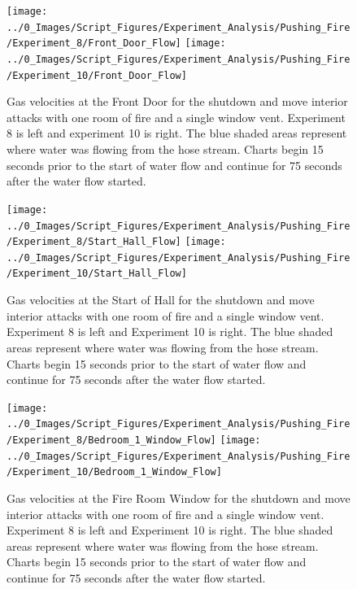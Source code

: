 \documentclass[12pt,oneside]{book}
\begin{document}
\begin{figure}[H]
\centering
\texttt{[image: ../0\_Images/Script\_Figures/Experiment\_Analysis/Pushing\_Fire/Experiment\_8/Front\_Door\_Flow]}
\texttt{[image: ../0\_Images/Script\_Figures/Experiment\_Analysis/Pushing\_Fire/Experiment\_10/Front\_Door\_Flow]}
\caption[Gas Velocities - Single Room of Fire - Interior - Shutdown and Move]{Gas velocities at the Front Door for the shutdown and move interior attacks with one room of fire and a single window vent. Experiment 8 is left and experiment 10 is right. The blue shaded areas represent where water was flowing from the hose stream. Charts begin 15 seconds prior to the start of water flow and continue for 75 seconds after the water flow started.}
\label{fig:push_fire_interior_shut_move_Front_Door}
\end{figure}

\begin{figure}[H]
\centering
\texttt{[image: ../0\_Images/Script\_Figures/Experiment\_Analysis/Pushing\_Fire/Experiment\_8/Start\_Hall\_Flow]}
\texttt{[image: ../0\_Images/Script\_Figures/Experiment\_Analysis/Pushing\_Fire/Experiment\_10/Start\_Hall\_Flow]}
\caption[Gas Velocities - Single Room of Fire - Interior - Shutdown and Move]{Gas velocities at the Start of Hall for the shutdown and move interior attacks with one room of fire and a single window vent. Experiment 8 is left and Experiment 10 is right. The blue shaded areas represent where water was flowing from the hose stream. Charts begin 15 seconds prior to the start of water flow and continue for 75 seconds after the water flow started.}
\label{fig:push_fire_interior_shut_move_Hall}
\end{figure}

\begin{figure}[H]
\centering
\texttt{[image: ../0\_Images/Script\_Figures/Experiment\_Analysis/Pushing\_Fire/Experiment\_8/Bedroom\_1\_Window\_Flow]}
\texttt{[image: ../0\_Images/Script\_Figures/Experiment\_Analysis/Pushing\_Fire/Experiment\_10/Bedroom\_1\_Window\_Flow]}
\caption[Gas Velocities - Single Room of Fire - Interior - Shutdown and Move]{Gas velocities at the Fire Room Window for the shutdown and move interior attacks with one room of fire and a single window vent. Experiment 8 is left and Experiment 10 is right. The blue shaded areas represent where water was flowing from the hose stream. Charts begin 15 seconds prior to the start of water flow and continue for 75 seconds after the water flow started.}
\label{fig:push_fire_interior_shut_move_Fire_Room}
\end{figure}
\end{document}
